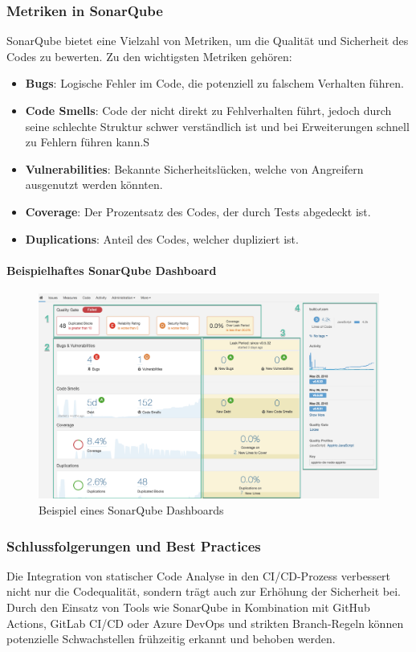 \subsubsection{Metriken in SonarQube}

SonarQube bietet eine Vielzahl von Metriken, um die Qualität und Sicherheit des Codes zu bewerten. Zu den wichtigsten Metriken gehören:

\begin{itemize}
    \item \textbf{Bugs}: Logische Fehler im Code, die potenziell zu falschem Verhalten führen.
    \item \textbf{Code Smells}: Code der nicht direkt zu Fehlverhalten führt, jedoch durch seine schlechte Struktur schwer verständlich ist und bei Erweiterungen schnell zu Fehlern führen kann.S
    \item \textbf{Vulnerabilities}: Bekannte Sicherheitslücken, welche von Angreifern ausgenutzt werden könnten.
    \item \textbf{Coverage}: Der Prozentsatz des Codes, der durch Tests abgedeckt ist.
    \item \textbf{Duplications}: Anteil des Codes, welcher dupliziert ist.
\end{itemize}

\paragraph{Beispielhaftes SonarQube Dashboard}

\begin{figure}[h!]
\centering
\includegraphics[width=\textwidth]{img/sonarqube_dashboard.png}
\caption{Beispiel eines SonarQube Dashboards}
\label{fig:sonarqube_dashboard}
\end{figure}

\subsubsection{Schlussfolgerungen und Best Practices}

Die Integration von statischer Code Analyse in den CI/CD-Prozess verbessert nicht nur die Codequalität, sondern trägt auch zur Erhöhung der Sicherheit bei. Durch den Einsatz von Tools wie SonarQube in Kombination mit GitHub Actions, GitLab CI/CD oder Azure DevOps und strikten Branch-Regeln können potenzielle Schwachstellen frühzeitig erkannt und behoben werden.
